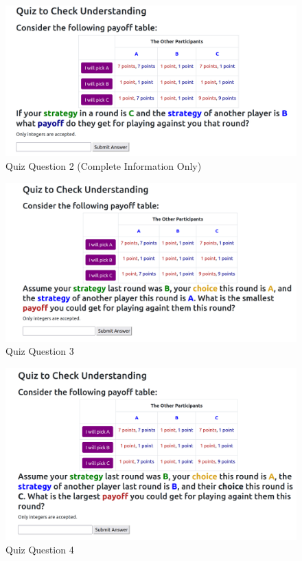 \begin{figure}[h]
\captionsetup{justification=centering}
  \caption{Quiz Question 2 (Complete Information Only)}
   \label{fig:QuizQ2}
    \includegraphics[width = \textwidth]{Images/Q2.png}  
\end{figure}

\begin{figure}[h]
\captionsetup{justification=centering}
  \caption{Quiz Question 3}
   \label{fig:QuizQ3}
    \includegraphics[width = \textwidth]{Images/Q3.png}
\end{figure}

\begin{figure}[h]
\captionsetup{justification=centering}
  \caption{Quiz Question 4}
   \label{fig:QuizQ4}
    \includegraphics[width = \textwidth]{Images/Q4.png}
\end{figure}

